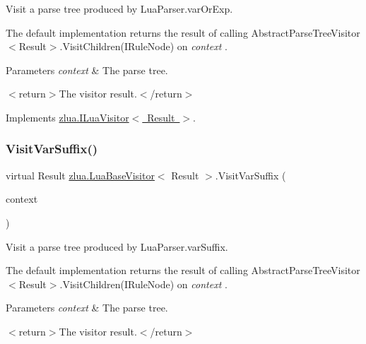 Visit a parse tree produced by Lua\+Parser.\+var\+Or\+Exp. 

The default implementation returns the result of calling Abstract\+Parse\+Tree\+Visitor$<$\+Result$>$.\+Visit\+Children(\+I\+Rule\+Node) on {\itshape context} . 


\begin{DoxyParams}{Parameters}
{\em context} & The parse tree.\\
\hline
\end{DoxyParams}
$<$return$>$The visitor result.$<$/return$>$ 

Implements \mbox{\hyperlink{interfacezlua_1_1_i_lua_visitor_a5b0f7be633f04468e77f13dc194c2511}{zlua.\+I\+Lua\+Visitor$<$ Result $>$}}.

\mbox{\label{classzlua_1_1_lua_base_visitor_a43417c615a3946d541cbecfec5d5a861}} 
\subsubsection{\texorpdfstring{Visit\+Var\+Suffix()}{VisitVarSuffix()}}
{\footnotesize\ttfamily virtual Result \mbox{\hyperlink{classzlua_1_1_lua_base_visitor}{zlua.\+Lua\+Base\+Visitor}}$<$ Result $>$.Visit\+Var\+Suffix (\begin{DoxyParamCaption}\item[{\mbox{[}\+Not\+Null\mbox{]} \mbox{\hyperlink{classzlua_1_1_lua_parser_1_1_var_suffix_context}{Lua\+Parser.\+Var\+Suffix\+Context}}}]{context }\end{DoxyParamCaption})\hspace{0.3cm}{\ttfamily [virtual]}}



Visit a parse tree produced by Lua\+Parser.\+var\+Suffix. 

The default implementation returns the result of calling Abstract\+Parse\+Tree\+Visitor$<$\+Result$>$.\+Visit\+Children(\+I\+Rule\+Node) on {\itshape context} . 


\begin{DoxyParams}{Parameters}
{\em context} & The parse tree.\\
\hline
\end{DoxyParams}
$<$return$>$The visitor result.$<$/return$>$ 


